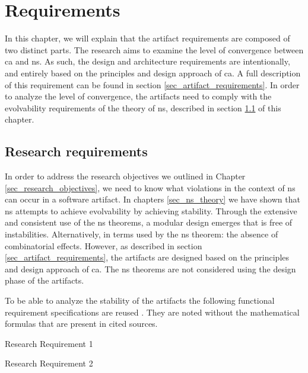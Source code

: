 \chapter{Requirements} \label{chap_requirements} 

In this chapter, we will explain that the artifact requirements are composed of two
distinct parts. The research aims to examine the level of convergence between \gls{ca} and
\gls{ns}. As such, the design and architecture requirements are intentionally, and entirely 
based on the principles and design approach of \gls{ca}. A full description of this requirement
can be found in section \ref{sec_artifact_requirements}. In order to analyze the level of
convergence, the artifacts need to comply with the evolvability requirements of the theory
of \gls{ns}, described in section \ref{sec_research_requirements} of this chapter.

\section{Research requirements} \label{sec_research_requirements} 

In order to address the research objectives we outlined in Chapter
\ref{sec_research_objectives}, we need to know what violations in the context of \gls{ns}
can occur in a software artifact. In chapters \ref{sec_ns_theory} we have shown that
\gls{ns} attempts to achieve evolvability by achieving stability. Through the extensive
and consistent use of the \gls{ns} theorems, a modular design emerges that is free of
instabilities. Alternatively, in terms used by the \gls{ns} theorem: the absence of
combinatorial effects. However, as described in section \ref{sec_artifact_requirements},
the artifacts are designed based on the principles and design approach of \gls{ca}. The
\gls{ns} theorems are not considered using the design phase of the artifacts. 

To be able to analyze the stability of the artifacts the following functional requirement
specifications are reused \parencite[254-259]{mannaert_normalized_2016}. They are noted
without the mathematical formulas that are present in cited sources.


{Research Requirement 1}

 {Research Requirement 2}

